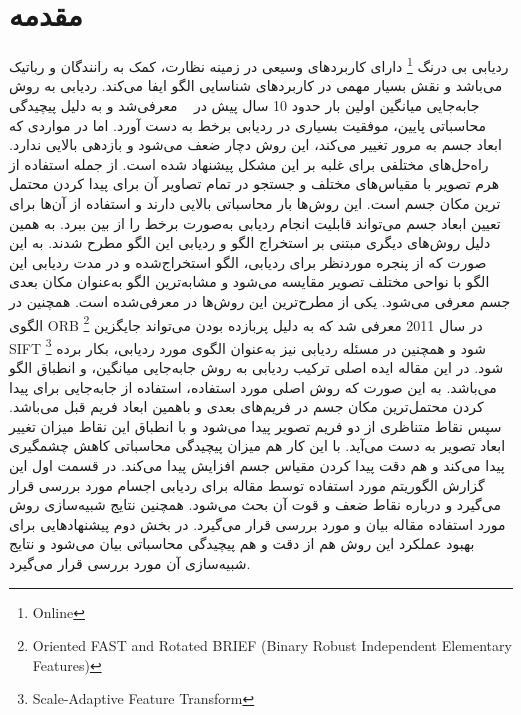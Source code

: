 \documentclass[paper=a4, fontsize=12pt]{article} %
\begin{document}
\section{مقدمه}
ردیابی بی درنگ \footnote{Online}  دارای کاربردهای وسیعی در زمینه نظارت، کمک به رانندگان و رباتیک می‌باشد و نقش بسیار مهمی در کاربردهای شناسایی الگو ایفا می‌کند.
ردیابی به روش جابه‌جایی میانگین اولین بار حدود 10 سال پیش در
~\cite{1Bedfold}
 معرفی‌شد و به دلیل پیچیدگی محاسباتی پایین، موفقیت بسیاری در ردیابی برخط به دست آورد. اما در مواردی که ابعاد جسم به مرور تغییر می‌کند، این روش دچار ضعف می‌شود و بازدهی بالایی ندارد. راه‌حل‌های مختلفی برای غلبه بر این مشکل پیشنهاد شده است. از جمله استفاده از هرم تصویر با مقیاس‌های مختلف و جستجو در تمام تصاویر آن برای پیدا کردن محتمل ترین مکان جسم
\cite{2SVT}
است.
این روش‌ها بار محاسباتی بالایی دارند و استفاده از آن‌ها برای تعیین ابعاد جسم می‌تواند قابلیت انجام ردیابی به‌صورت برخط را از بین ببرد. به همین دلیل روش‌های دیگری مبتنی بر استخراج الگو و ردیابی این الگو مطرح شدند. به این صورت که از پنجره موردنظر برای ردیابی، الگو استخراج‌شده و در مدت ردیابی این الگو با نواحی مختلف تصویر مقایسه می‌شود و مشابه‌ترین الگو به‌عنوان مکان بعدی جسم معرفی می‌شود. یکی از مطرح‌ترین این روش‌ها در
\cite{3Oikonomidis}
 معرفی‌شده است. همچنین در
\cite{4Zhang}
  الگوی ORB \footnote{Oriented FAST and Rotated BRIEF (Binary Robust Independent Elementary Features)} در سال 2011 معرفی شد که به دلیل پربازده بودن می‌تواند جایگزین SIFT \footnote{Scale-Adaptive Feature Transform} شود و همچنین در مسئله ردیابی نیز به‌عنوان الگوی مورد ردیابی، بکار برده شود.
در این مقاله ایده اصلی ترکیب ردیابی به روش جابه‌جایی میانگین، و انطباق الگو می‌باشد. به این صورت که روش اصلی مورد استفاده، استفاده از جابه‌جایی برای پیدا کردن محتمل‌ترین مکان جسم در فریم‌های بعدی و باهمین ابعاد فریم قبل می‌باشد. سپس نقاط متناظری از دو فریم تصویر پیدا می‌شود و با انطباق این نقاط میزان تغییر ابعاد تصویر به دست می‌آید. با این کار هم میزان پیچیدگی محاسباتی کاهش چشمگیری پیدا می‌کند و هم دقت پیدا کردن مقیاس جسم افزایش پیدا می‌کند.
در قسمت اول این گزارش الگوریتم مورد استفاده توسط مقاله برای ردیابی اجسام مورد بررسی قرار می‌گیرد و درباره نقاط ضعف و قوت آن بحث می‌شود. همچنین نتایج شبیه‌سازی روش مورد استفاده مقاله بیان و مورد بررسی قرار می‌گیرد. در بخش دوم پیشنهاد‌هایی برای بهبود عملکرد این روش هم از دقت و هم پیچیدگی محاسباتی بیان می‌شود و نتایج شبیه‌سازی آن مورد بررسی قرار می‌گیرد.
\end{document}
